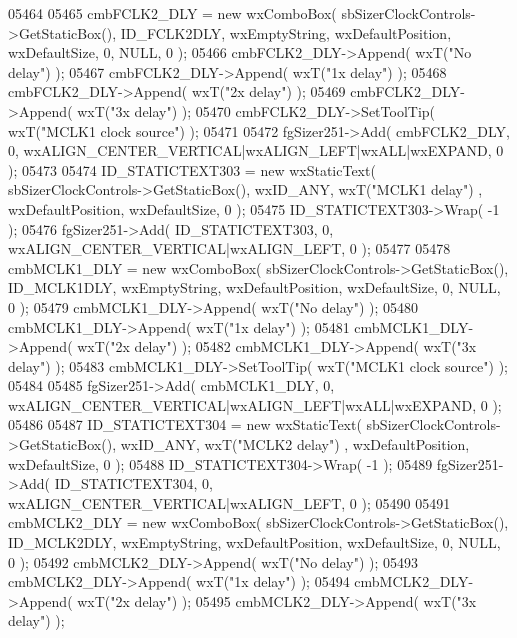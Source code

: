 \begin{DoxyCode}
05464     
05465     cmbFCLK2_DLY = \textcolor{keyword}{new} wxComboBox( sbSizerClockControls->GetStaticBox(), 
      ID_FCLK2DLY, wxEmptyString, wxDefaultPosition, wxDefaultSize, 0, NULL, 0 );
05466     cmbFCLK2_DLY->Append( wxT(\textcolor{stringliteral}{"No delay"}) );
05467     cmbFCLK2_DLY->Append( wxT(\textcolor{stringliteral}{"1x delay"}) );
05468     cmbFCLK2_DLY->Append( wxT(\textcolor{stringliteral}{"2x delay"}) );
05469     cmbFCLK2_DLY->Append( wxT(\textcolor{stringliteral}{"3x delay"}) );
05470     cmbFCLK2_DLY->SetToolTip( wxT(\textcolor{stringliteral}{"MCLK1 clock source"}) );
05471     
05472     fgSizer251->Add( cmbFCLK2_DLY, 0, wxALIGN\_CENTER\_VERTICAL|wxALIGN\_LEFT|wxALL|wxEXPAND, 0 );
05473     
05474     ID_STATICTEXT303 = \textcolor{keyword}{new} wxStaticText( sbSizerClockControls->GetStaticBox(), wxID\_ANY, wxT(\textcolor{stringliteral}{"MCLK1 delay"})
      , wxDefaultPosition, wxDefaultSize, 0 );
05475     ID_STATICTEXT303->Wrap( -1 );
05476     fgSizer251->Add( ID_STATICTEXT303, 0, wxALIGN\_CENTER\_VERTICAL|wxALIGN\_LEFT, 0 );
05477     
05478     cmbMCLK1_DLY = \textcolor{keyword}{new} wxComboBox( sbSizerClockControls->GetStaticBox(), 
      ID_MCLK1DLY, wxEmptyString, wxDefaultPosition, wxDefaultSize, 0, NULL, 0 );
05479     cmbMCLK1_DLY->Append( wxT(\textcolor{stringliteral}{"No delay"}) );
05480     cmbMCLK1_DLY->Append( wxT(\textcolor{stringliteral}{"1x delay"}) );
05481     cmbMCLK1_DLY->Append( wxT(\textcolor{stringliteral}{"2x delay"}) );
05482     cmbMCLK1_DLY->Append( wxT(\textcolor{stringliteral}{"3x delay"}) );
05483     cmbMCLK1_DLY->SetToolTip( wxT(\textcolor{stringliteral}{"MCLK1 clock source"}) );
05484     
05485     fgSizer251->Add( cmbMCLK1_DLY, 0, wxALIGN\_CENTER\_VERTICAL|wxALIGN\_LEFT|wxALL|wxEXPAND, 0 );
05486     
05487     ID_STATICTEXT304 = \textcolor{keyword}{new} wxStaticText( sbSizerClockControls->GetStaticBox(), wxID\_ANY, wxT(\textcolor{stringliteral}{"MCLK2 delay"})
      , wxDefaultPosition, wxDefaultSize, 0 );
05488     ID_STATICTEXT304->Wrap( -1 );
05489     fgSizer251->Add( ID_STATICTEXT304, 0, wxALIGN\_CENTER\_VERTICAL|wxALIGN\_LEFT, 0 );
05490     
05491     cmbMCLK2_DLY = \textcolor{keyword}{new} wxComboBox( sbSizerClockControls->GetStaticBox(), 
      ID_MCLK2DLY, wxEmptyString, wxDefaultPosition, wxDefaultSize, 0, NULL, 0 );
05492     cmbMCLK2_DLY->Append( wxT(\textcolor{stringliteral}{"No delay"}) );
05493     cmbMCLK2_DLY->Append( wxT(\textcolor{stringliteral}{"1x delay"}) );
05494     cmbMCLK2_DLY->Append( wxT(\textcolor{stringliteral}{"2x delay"}) );
05495     cmbMCLK2_DLY->Append( wxT(\textcolor{stringliteral}{"3x delay"}) );

\end{DoxyCode}
